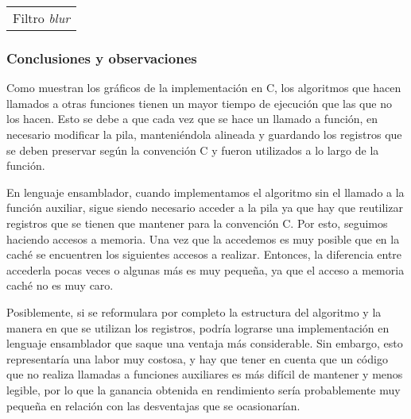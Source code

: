                 {\centering \begin{tabular}{c}
                    {\small Filtro \emph{blur}} \\
                \end{tabular}}

            \subsubsection*{Conclusiones y observaciones}       

                Como muestran los gráficos de la implementación en C, los algoritmos que hacen llamados a otras funciones tienen un mayor tiempo de ejecución que las que no los hacen. Esto se debe a que cada vez que se hace un llamado a función, en necesario modificar la pila, manteniéndola alineada y guardando los registros que se deben preservar según la convención C y fueron utilizados a lo largo de la función.

                En lenguaje ensamblador, cuando implementamos el algoritmo sin el llamado a la función auxiliar, sigue siendo necesario acceder a la pila ya que hay que reutilizar registros que se tienen que mantener para la convención C. Por esto, seguimos haciendo accesos a memoria. Una vez que la accedemos es muy posible que en la caché se encuentren los siguientes accesos a realizar. Entonces, la diferencia entre accederla pocas veces o algunas más es muy pequeña, ya que el acceso a memoria caché no es muy caro.

                Posiblemente, si se reformulara por completo la estructura del algoritmo y la manera en que se utilizan los registros, podría lograrse una implementación en lenguaje ensamblador que saque una ventaja más considerable. Sin embargo, esto representaría una labor muy costosa, y hay que tener en cuenta que un código que no realiza llamadas a funciones auxiliares es más difícil de mantener y menos legible, por lo que la ganancia obtenida en rendimiento sería probablemente muy pequeña en relación con las desventajas que se ocasionarían.
